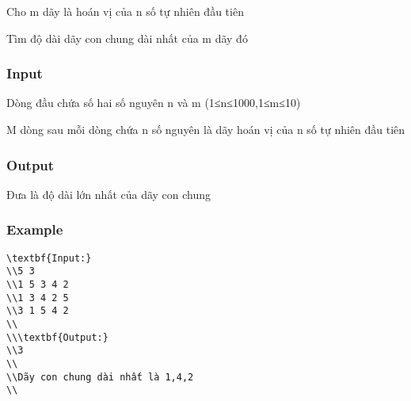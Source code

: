 



   Cho m dãy là hoán vị của n số tự nhiên đầu tiên  

   Tìm độ dài dãy con chung dài nhất của m dãy đó  

\subsubsection{   Input  }

   Dòng đầu chứa số hai số nguyên n và m (1≤n≤1000,1≤m≤10)  

   M dòng sau mỗi dòng chứa n số nguyên là dãy hoán vị của n số tự nhiên đầu tiên  

\subsubsection{   Output  }

   Đưa là độ dài lớn nhất của dãy con chung  

\subsubsection{   Example  }
\begin{verbatim}
\textbf{Input:}
\\5 3
\\1 5 3 4 2
\\1 3 4 2 5
\\3 1 5 4 2
\\
\\\textbf{Output:}
\\3
\\
\\Dãy con chung dài nhất là 1,4,2
\\\end{verbatim}